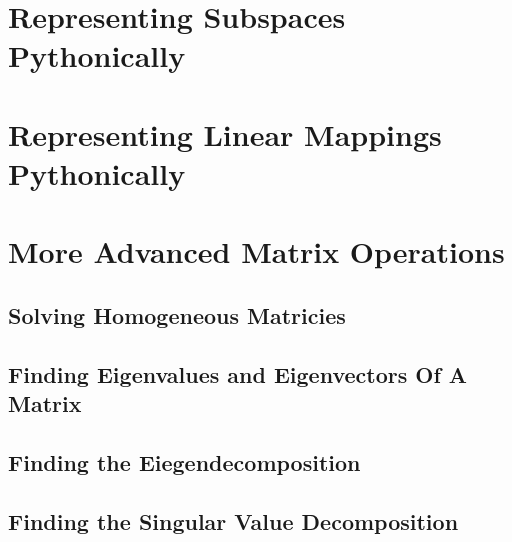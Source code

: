\documentclass[12pt, a4paper]{article}
\begin{document}
\section{Representing Subspaces Pythonically}

\section{Representing Linear Mappings Pythonically}

\section{More Advanced Matrix Operations}

\subsection{Solving Homogeneous Matricies}

\subsection{Finding Eigenvalues and Eigenvectors Of A Matrix}

\subsection{Finding the Eiegendecomposition}

\subsection{Finding the Singular Value Decomposition}
\end{document}
